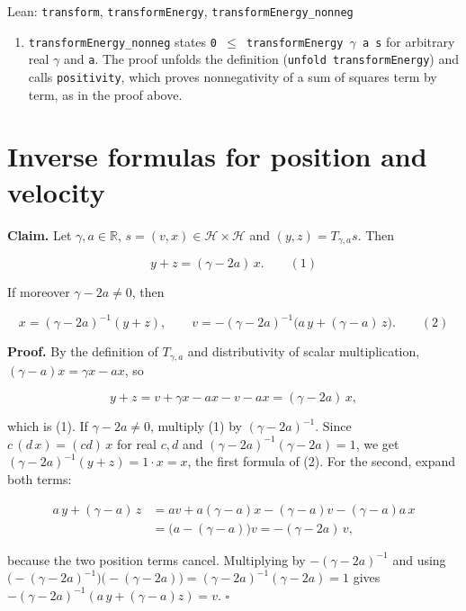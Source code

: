 \documentclass[11pt,a4paper]{article}
\begin{document}
\begin{leanbox}{Lean: \texttt{transform}, \texttt{transformEnergy}, \texttt{transformEnergy\_\allowbreak{}nonneg}}
\begin{enumerate}
\item \texttt{transform\allowbreak{}Energy\_\allowbreak{}nonneg} states \texttt{0 \ensuremath{\le} transform\allowbreak{}Energy \ensuremath{\gamma} a s} for arbitrary real \texttt{\ensuremath{\gamma}} and \texttt{a}. The proof unfolds the definition (\texttt{unfold transform\allowbreak{}Energy}) and calls \texttt{positivity}, which proves nonnegativity of a sum of squares term by term, as in the proof above.

\end{enumerate}
\end{leanbox}

\section{\texorpdfstring{Inverse formulas for position and velocity}{Inverse formulas for position and velocity}}


\textbf{Claim.} Let \(\gamma,a\in\mathbb R\), \(s=(v,x)\in \mathcal H\times \mathcal H\) and \((y,z)=T_{\gamma,a}s\). Then


\[y+z=(\gamma-2a)\,x.\qquad(1)\]


If moreover \(\gamma-2a\neq0\), then


\[x=(\gamma-2a)^{-1}(y+z),\qquad v=-(\gamma-2a)^{-1}\bigl(a\,y+(\gamma-a)\,z\bigr).\qquad(2)\]


\textbf{Proof.} By the definition of \(T_{\gamma,a}\) and distributivity of scalar multiplication, \((\gamma-a)x=\gamma x-ax\), so


\[y+z=v+\gamma x-ax-v-ax=(\gamma-2a)\,x,\]


which is (1). If \(\gamma-2a\neq0\), multiply (1) by \((\gamma-2a)^{-1}\). Since \(c\,(d\,x)=(cd)\,x\) for real \(c,d\) and \((\gamma-2a)^{-1}(\gamma-2a)=1\), we get \((\gamma-2a)^{-1}(y+z)=1\cdot x=x\), the first formula of (2). For the second, expand both terms:


\[\begin{aligned}
a\,y+(\gamma-a)\,z&=a v+a(\gamma-a)x-(\gamma-a)v-(\gamma-a)a\,x\\
&=\bigl(a-(\gamma-a)\bigr)v=-(\gamma-2a)\,v ,
\end{aligned}\]


because the two position terms cancel. Multiplying by \(-(\gamma-2a)^{-1}\) and using \(\bigl(-(\gamma-2a)^{-1}\bigr)\bigl(-(\gamma-2a)\bigr)=(\gamma-2a)^{-1}(\gamma-2a)=1\) gives \(-(\gamma-2a)^{-1}(a\,y+(\gamma-a)z)=v\). \(\square\)
\end{document}
